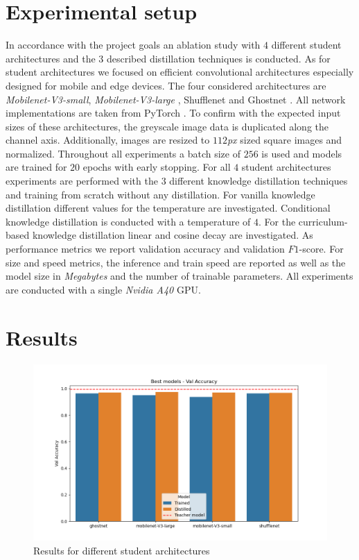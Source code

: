 \documentclass{article}
\begin{document}
\section{Experimental setup}
In accordance with the project goals an ablation study with $ 4 $ different student architectures and the $ 3 $ described distillation techniques is conducted. As for student architectures we focused on efficient convolutional architectures especially designed for mobile and edge devices. The four considered architectures are \textit{Mobilenet-V3-small}, \textit{Mobilenet-V3-large} \cite{mobilenetv3}, Shufflenet \cite{shufflenet} and Ghostnet \cite{han2020ghostnet}. All network implementations are taken from PyTorch \cite{pytorch}. To confirm with the expected input sizes of these architectures, the greyscale image data is duplicated along the channel axis. Additionally, images are resized to $ 112 $\textit{px} sized square images and normalized. Throughout all experiments a batch size of $ 256 $ is used and models are trained for $ 20 $ epochs with early stopping. For all $ 4 $ student architectures experiments are performed with the $ 3 $ different knowledge distillation techniques and training from scratch without any distillation. For vanilla knowledge distillation different values for the temperature are investigated. Conditional knowledge distillation is conducted with a temperature of $ 4 $. For the curriculum-based knowledge distillation linear and cosine decay are investigated.
As performance metrics we report validation accuracy and validation $ F1 $-score. For size and speed metrics, the inference and train speed are reported as well as the model size in \textit{Megabytes} and the number  of trainable parameters.
All experiments are conducted with a single \textit{Nvidia A40} GPU. 

\section{Results}

\begin{figure}
	\centering
	\includegraphics[width=\linewidth]{assets/val accuracy_Best}
	\caption{Results for different student architectures}
	\label{fig:acc_res}
\end{figure}
\end{document}
